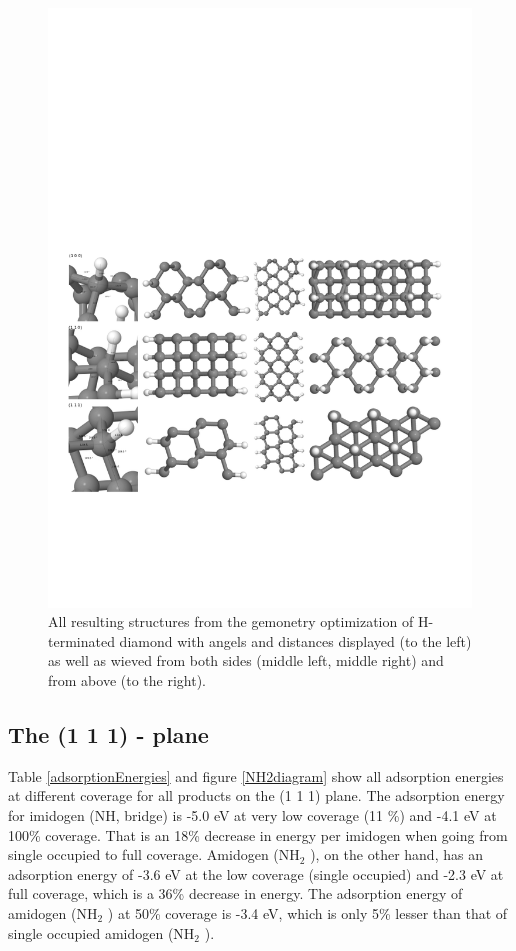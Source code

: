 \documentclass[10pt,a4paper]{article}
\begin{document}
\begin{figure} \captionsetup{width=.8\linewidth} \caption{All resulting structures from the gemonetry optimization of H-terminated diamond with angels and distances displayed (to the left) as well as wieved from both sides (middle left, middle right) and from above (to the right).} \label{H_terminated}
%
\includegraphics[width=.8\linewidth]{pictures/H_terminated2.png}
\end{figure}

\subsection{The (1 1 1) - plane}
Table \ref{adsorptionEnergies} and figure \ref{NH2diagram} show all adsorption energies at different coverage for all products on the (1 1 1) plane. The adsorption energy for imidogen (NH, bridge) is -5.0 eV at very low coverage (11 \%) and -4.1 eV at 100\% coverage. That is an 18\% decrease in energy per imidogen when going from single occupied to full coverage. Amidogen (NH$_2$ ), on the other hand, has an adsorption energy of -3.6 eV at the low coverage (single occupied) and -2.3 eV at full coverage, which is  a 36\% decrease in energy. The adsorption energy of amidogen (NH$_2$ ) at 50\% coverage is -3.4 eV, which is only 5\% lesser than that of single occupied amidogen (NH$_2$ ).
\end{document}
